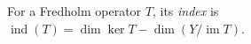 
For a Fredholm operator $T$, its \emph{index} is $\operatorname{ind}(T)=\dim\ker T-\dim(Y/\operatorname{im}T)$.
